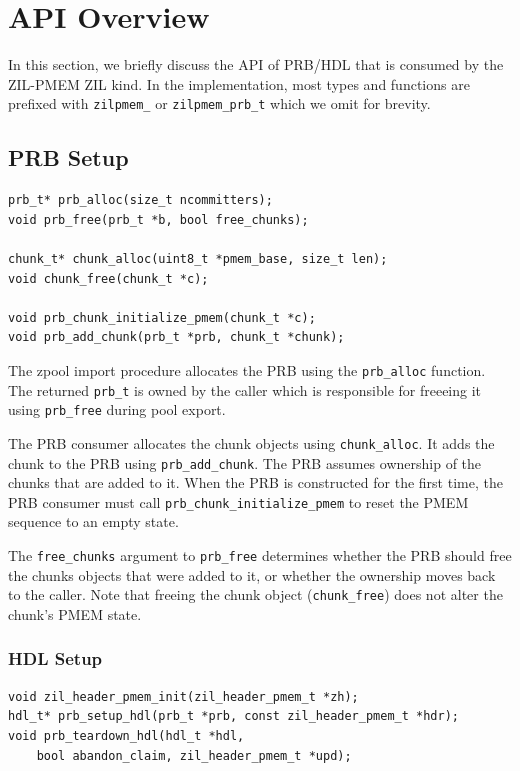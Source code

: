 \documentclass[12pt,a4paper,twoside]{book}
\begin{document}
\section{API Overview}\label{di:prb:api}
In this section, we briefly discuss the API of PRB/HDL that is consumed by the ZIL-PMEM ZIL kind.
In the implementation, most types and functions are prefixed with \lstinline{zilpmem_} or \lstinline{zilpmem_prb_t} which we omit for brevity.

\subsection{PRB Setup}
\begin{lstlisting}
prb_t* prb_alloc(size_t ncommitters);
void prb_free(prb_t *b, bool free_chunks);

chunk_t* chunk_alloc(uint8_t *pmem_base, size_t len);
void chunk_free(chunk_t *c);

void prb_chunk_initialize_pmem(chunk_t *c);
void prb_add_chunk(prb_t *prb, chunk_t *chunk);
\end{lstlisting}

The zpool import procedure allocates the PRB using the \lstinline{prb_alloc} function.
The returned \lstinline{prb_t} is owned by the caller which is responsible for freeeing it using \lstinline{prb_free} during pool export.

The PRB consumer allocates the chunk objects using \lstinline{chunk_alloc}.
It adds the chunk to the PRB using \lstinline{prb_add_chunk}.
The PRB assumes ownership of the chunks that are added to it.
When the PRB is constructed for the first time, the PRB consumer must call \lstinline{prb_chunk_initialize_pmem} to reset the PMEM sequence to an empty state.

The \lstinline{free_chunks} argument to \lstinline{prb_free} determines whether the PRB should free the chunks objects that were added to it, or whether the ownership moves back to the caller.
Note that freeing the chunk object (\lstinline{chunk_free}) does not alter the chunk's PMEM state.

\subsubsection{HDL Setup}\label{di:prb:api:hdl}
\begin{lstlisting}
void zil_header_pmem_init(zil_header_pmem_t *zh);
hdl_t* prb_setup_hdl(prb_t *prb, const zil_header_pmem_t *hdr);
void prb_teardown_hdl(hdl_t *hdl,
    bool abandon_claim, zil_header_pmem_t *upd);
\end{lstlisting}
\end{document}
